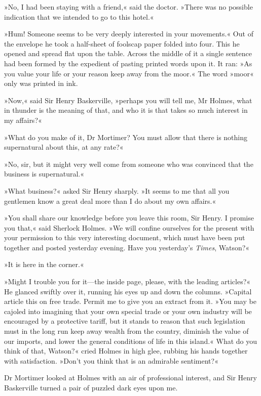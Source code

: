 »No, I had been staying with a friend,« said the doctor. »There was no possible indication that we intended to go to this hotel.«

»Hum! Someone seems to be very deeply interested in your movements.« Out of the envelope he took a half-sheet of foolscap paper folded into four. This he opened and spread flat upon the table. Across the middle of it a single sentence had been formed by the expedient of pasting printed words upon it. It ran: »As you value your life or your reason keep away from the moor.« The word »moor« only was printed in ink.

»Now,« said Sir Henry Baskerville, »perhaps you will tell me, Mr Holmes, what in thunder is the meaning of that, and who it is that takes so much interest in my affairs?«

»What do you make of it, Dr Mortimer? You must allow that there is nothing supernatural about this, at any rate?«

»No, sir, but it might very well come from someone who was convinced that the business is supernatural.«

»What business?« asked Sir Henry sharply. »It seems to me that all you gentlemen know a great deal more than I do about my own affairs.«

»You shall share our knowledge before you leave this room, Sir Henry. I promise you that,« said Sherlock Holmes. »We will confine ourselves for the present with your permission to this very interesting document, which must have been put together and posted yesterday evening. Have you yesterday's \textit{Times}, Watson?«

»It is here in the corner.«

»Might I trouble you for it—the inside page, please, with the leading articles?«  He glanced swiftly over it, running his eyes up and down the columns. »Capital article this on free trade. Permit me to give you an extract from it. »You may be cajoled into imagining that your own special trade or your own industry will be encouraged by a protective tariff, but it stands to reason that such legislation must in the long run keep away wealth from the country, diminish the value of our imports, and lower the general conditions of life in this island.« What do you think of that, Watson?« cried Holmes in high glee, rubbing his hands together with satisfaction. »Don't you think that is an admirable sentiment?«


Dr Mortimer looked at Holmes with an air of professional interest, and Sir Henry Baskerville turned a pair of puzzled dark eyes upon me.

